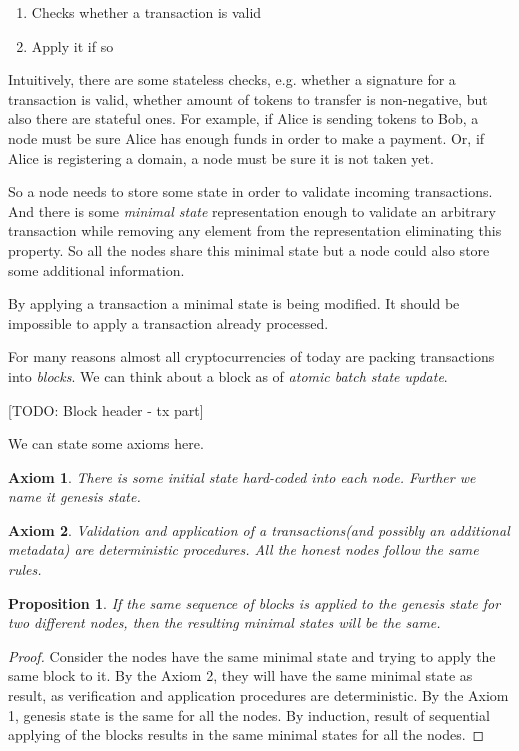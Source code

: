 \documentclass[]{report}   %
\newtheorem{axiom}{Axiom}
\newtheorem{proposition}{Proposition}
\begin{document}
    \begin{enumerate}
		\item Checks whether a transaction is valid
		\item Apply it if so
    \end{enumerate}

	Intuitively, there are some stateless checks, e.g. whether a signature for a transaction is valid, whether amount of tokens to transfer is non-negative, but also there are stateful ones. For example, if Alice is sending tokens to Bob, a node must be sure Alice has enough funds in order to make a payment. Or, if Alice is registering a domain, a node must be sure it is not taken yet. 

	So a node needs to store some state in order to validate incoming transactions. And there is some \textit{minimal state} representation enough to validate an arbitrary transaction while removing any element from the representation eliminating this property. So all the nodes share this minimal state but a node could also store some additional information. 

	By applying a transaction a minimal state is being modified. It should be impossible to apply a transaction already processed. 

	For many reasons almost all cryptocurrencies of today are packing transactions into \textit{blocks}. We can think about a block as of \textit{atomic batch state update}. 

    [TODO: Block header - tx part]


	We can state some axioms here.

	\begin{axiom}
	 There is some initial state hard-coded into each node. Further we name it \textit{genesis state}.
	\end{axiom}

    \begin{axiom} 
     Validation and application of a transactions(and possibly an additional metadata) are deterministic procedures. All the honest nodes follow the same rules. 
    \end{axiom}

	\begin{proposition} If the same sequence of blocks is applied to the genesis state for two different nodes, then the resulting minimal states will be the same.
	\end{proposition}	
	\begin{proof}Consider the nodes have the same minimal state and trying to apply the same block to it. By the Axiom 2, they will have the same minimal state as result, as verification and application procedures are deterministic. By the Axiom 1, genesis state is the same for all the nodes. By induction, result of sequential applying of the blocks results in the same minimal states for all the nodes.\end{proof}
\end{document}
